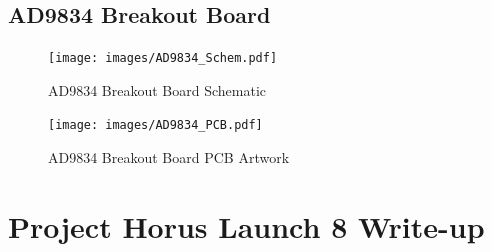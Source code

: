 \documentclass[a4paper,12pt]{article}
\begin{document}
\begin{appendices}
\subsection{AD9834 Breakout Board}
\label{ad9834_breakout}
\begin{figure}[h!]
\begin{center}
\texttt{[image: images/AD9834\_Schem.pdf]}
\caption{AD9834 Breakout Board Schematic}
\label{ad9834_schem}
\end{center}
\end{figure}
\begin{figure}[h!]
\begin{center}
\texttt{[image: images/AD9834\_PCB.pdf]}
\caption{AD9834 Breakout Board PCB Artwork}
\label{ad9834_PCB}
\end{center}
\end{figure}

\section{Project Horus Launch 8 Write-up}
\label{horus8}


\end{appendices}
\end{document}
